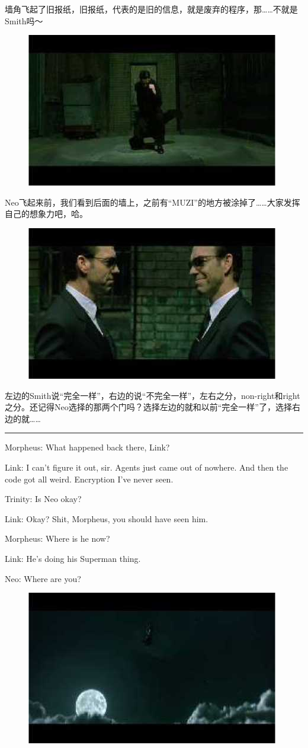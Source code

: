 \documentclass[UTF8]{ctexart}
\newcommand{\myparsep}{\noindent \rule[0.5ex]{\linewidth}{1pt}}
\newenvironment{myquote}{\color{green} \setlength{\leftskip}{6em} \setlength{\rightskip}{4em} \setlength{\parindent}{-2em}}{\par}
\begin{document}
墙角飞起了旧报纸，旧报纸，代表的是旧的信息，就是废弃的程序，那……不就是Smith吗～

\begin{figure}[htb]
\centering
\includegraphics[width=0.5\linewidth]{fig/read_reloaded-25}
\end{figure}

Neo飞起来前，我们看到后面的墙上，之前有“MUZI”的地方被涂掉了……大家发挥自己的想象力吧，哈。

\begin{figure}[htb]
\centering
\includegraphics[width=0.5\linewidth]{fig/read_reloaded-26}
\end{figure}

左边的Smith说“完全一样”，右边的说“不完全一样”，左右之分，non-right和right之分。还记得Neo选择的那两个门吗？选择左边的就和以前“完全一样”了，选择右边的就……

\myparsep

\begin{myquote}
Morpheus: What happened back there, Link?

Link: I can't figure it out, sir. Agents just came out of nowhere. And then the code got all weird. Encryption I've never seen.

Trinity: Is Neo okay?

Link: Okay? Shit, Morpheus, you should have seen him.

Morpheus: Where is he now?

Link: He's doing his Superman thing.

Neo: Where are you?
\end{myquote}

\begin{figure}[htb]
\centering
\includegraphics[width=0.5\linewidth]{fig/read_reloaded-27}
\end{figure}
\end{document}
